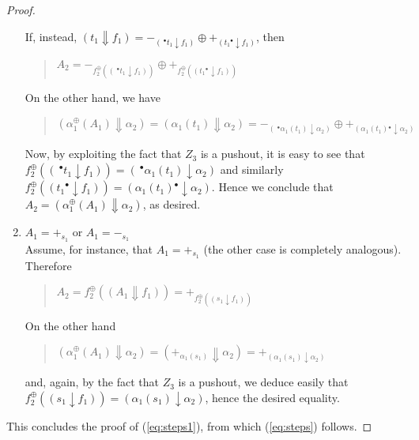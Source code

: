 \documentclass{LMCS}
\newcommand{\monSub}[2]{\ensuremath{{#1}_{#2}^\oplus}}
\newcommand{\res}[2]{\ensuremath{({#1}\!\downarrow\!{#2})}}
\newcommand{\sres}[2]{\ensuremath{({#1}\!\Downarrow\!{#2})}}
\newcommand{\pre}[1][(\cdot)]{\ensuremath{\!~^\bullet{#1}}}
\newcommand{\post}[1][(\cdot)]{\ensuremath{{#1} {^\bullet}}}
\begin{document}
\begin{proof}
\begin{enumerate}[$\bullet$]
    If, instead, $\sres{t_1}{f_1} = -_{\res{\pre[t_1]}{f_1}} \oplus
    +_{\res{\post[t_1]}{f_1}}$, then 
\begin{quote}
      $A_2 = -_{\monSub{f}{2}(\res{\pre[t_1]}{f_1})} \oplus
      +_{\monSub{f}{2}(\res{\post[t_1]}{f_1})}$
    \end{quote}
    On the other hand, we have
    \begin{quote}
      $\sres{\monSub{\alpha}{1}(A_1)}{\alpha_2} =
\sres{\alpha_1(t_1)}{\alpha_2} =
-_{\res{\pre[\alpha_1(t_1)]}{\alpha_2}} \oplus
      +_{\res{\post[\alpha_1(t_1)]}{\alpha_2}}
      $
    \end{quote}
      
    Now, by exploiting the fact that $Z_3$ is a pushout, it is easy to see that 
    $\monSub{f}{2}(\res{\pre[t_1]}{f_1}) = \res{\pre[\alpha_1(t_1)]}{\alpha_2}$
    and similarly $\monSub{f}{2}(\res{\post[t_1]}{f_1}) =
    \res{\post[\alpha_1(t_1)]}{\alpha_2}$. Hence we conclude that $A_2 =
    \sres{\monSub{\alpha}{1}(A_1)}{\alpha_2}$, as desired.
  

    \medskip

  \item $A_1 = +_{s_1}$ or $A_1 = -_{s_1}$\\
    Assume, for instance, that $A_1 = +_{s_1}$ (the other case is completely
    analogous). 
Therefore
    \begin{quote}
      $A_2 = \monSub{f}{2}(\sres{A_1}{f_1}) = +_{\monSub{f}{2}(\res{s_1}{f_1})}$
    \end{quote}
    On the other hand
    \begin{quote}
      $\sres{\monSub{\alpha}{1}(A_1)}{\alpha_2} = \sres{+_{\alpha_1(s_1)}}{\alpha_2}
      = +_{\res{\alpha_1(s_1)}{\alpha_2}}$      
    \end{quote}
    and, again, by the fact that $Z_3$ is a pushout, we deduce easily
    that $\monSub{f}{2}(\res{s_1}{f_1}) = \res{\alpha_1(s_1)}{\alpha_2}$, hence
    the desired equality.

\end{enumerate}
  This concludes the proof of (\ref{eq:steps1}), from which (\ref{eq:steps})
  follows.
  
  \bigskip
  

\end{proof}
\end{document}
